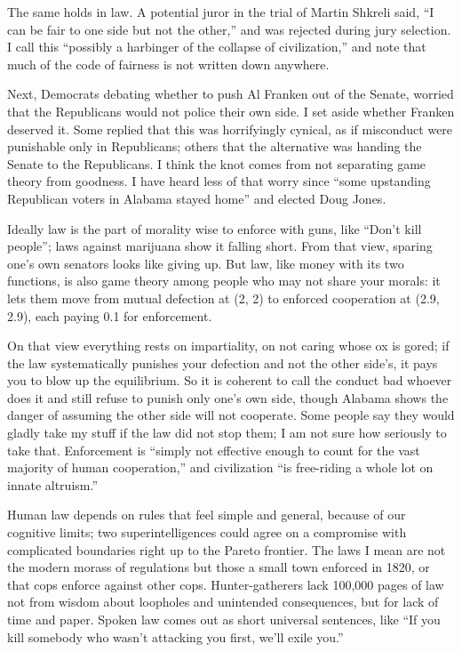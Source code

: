 The same holds in law. A potential juror in the trial of Martin Shkreli said, ``I can be fair to one side but not the other,'' and was rejected during jury selection. I call this ``possibly a harbinger of the collapse of civilization,'' and note that much of the code of fairness is not written down anywhere. 

Next, Democrats debating whether to push Al Franken out of the Senate, worried that the Republicans would not police their own side. I set aside whether Franken deserved it. Some replied that this was horrifyingly cynical, as if misconduct were punishable only in Republicans; others that the alternative was handing the Senate to the Republicans. I think the knot comes from not separating game theory from goodness. I have heard less of that worry since ``some upstanding Republican voters in Alabama stayed home'' and elected Doug Jones. 

Ideally law is the part of morality wise to enforce with guns, like ``Don't kill people''; laws against marijuana show it falling short. From that view, sparing one's own senators looks like giving up. But law, like money with its two functions, is also game theory among people who may not share your morals: it lets them move from mutual defection at (2, 2) to enforced cooperation at (2.9, 2.9), each paying 0.1 for enforcement.

On that view everything rests on impartiality, on not caring whose ox is gored; if the law systematically punishes your defection and not the other side's, it pays you to blow up the equilibrium. So it is coherent to call the conduct bad whoever does it and still refuse to punish only one's own side, though Alabama shows the danger of assuming the other side will not cooperate. Some people say they would gladly take my stuff if the law did not stop them; I am not sure how seriously to take that. Enforcement is ``simply not effective enough to count for the vast majority of human cooperation,'' and civilization ``is free-riding a whole lot on innate altruism.'' 

Human law depends on rules that feel simple and general, because of our cognitive limits; two superintelligences could agree on a compromise with complicated boundaries right up to the Pareto frontier. The laws I mean are not the modern morass of regulations but those a small town enforced in 1820, or that cops enforce against other cops. Hunter-gatherers lack 100,000 pages of law not from wisdom about loopholes and unintended consequences, but for lack of time and paper. Spoken law comes out as short universal sentences, like ``If you kill somebody who wasn't attacking you first, we'll exile you.''

